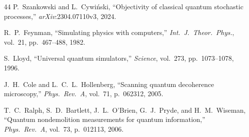 \documentclass[journal,twocolumn]{IEEEtran}
\theoremstyle{definition}
\theoremstyle{plain}
\begin{document}
\begin{thebibliography}{44}
P.~Szankowski and L.~Cywi\'{n}ski, ``Objectivity of classical
quantum stochastic processes,'' \emph{arXiv}:2304.07110v3, 2024.

R.~P.~Feynman, ``Simulating physics with computers,''
\emph{Int.\ J.\ Theor.\ Phys.}, vol.~21, pp.~467--488, 1982.

S.~Lloyd, ``Universal quantum simulators,'' \emph{Science},
vol.~273, pp.~1073--1078, 1996.

J.~H.~Cole and L.~C.~L.~Hollenberg, ``Scanning quantum decoherence
microscopy,'' \emph{Phys.\ Rev.\ A}, vol.~71, p.~062312, 2005.

T.~C.~Ralph, S.~D.~Bartlett, J.~L.~O'Brien, G.~J.~Pryde, and
H.~M.~Wiseman, ``Quantum nondemolition measurements for quantum
information,'' \emph{Phys.\ Rev.\ A}, vol.~73, p.~012113, 2006.

\end{thebibliography}
\end{document}
